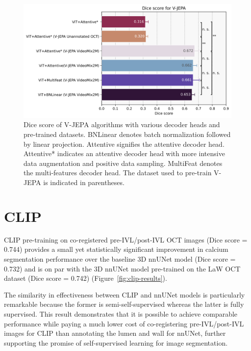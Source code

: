 \documentclass[a4paper,11pt,oneside]{report}
\begin{document}
\begin{figure}[hbt]
    \centering
    \includegraphics[width=0.75\linewidth]{figures/result_VJEPA_results.png}
    \caption{Dice score of V-JEPA algorithms with various decoder heads and pre-trained datasets. BNLinear denotes batch normalization followed by linear projection. Attentive signifies the attentive decoder head. Attentive* indicates an attentive decoder head with more intensive data augmentation and positive data sampling. MultiFeat denotes the multi-features decoder head. The dataset used to pre-train V-JEPA is indicated in parentheses.}
    \label{fig:vjepa-decoder-results}
\end{figure}


\section{CLIP}
CLIP pre-training on co-registered pre-IVL/post-IVL OCT images (Dice score = 0.744) provides a small yet statistically significant improvement in calcium segmentation performance over the baseline 3D nnUNet model (Dice score = 0.732) and is on par with the 3D nnUNet model pre-trained on the LaW OCT dataset (Dice score = 0.742) (Figure~\ref{fig:clip-results}). 

The similarity in effectiveness between CLIP and nnUNet models is particularly remarkable because the former is semi-self-supervised whereas the latter is fully supervised. This result demonstrates that it is possible to achieve comparable performance while paying a much lower cost of co-registering pre-IVL/post-IVL images for CLIP than annotating the lumen and wall for nnUNet, further supporting the promise of self-supervised learning for image segmentation.%
\end{document}
